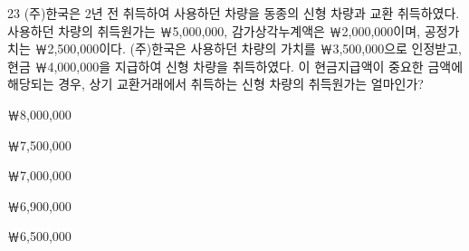 \begin{question}{23}
(주)한국은 2년 전 취득하여 사용하던 차량을 동종의 신형 차량과 교환 취득하였다. 사용하던 차량의 취득원가는 ￦5,000,000, 감가상각누계액은 ￦2,000,000이며, 공정가치는 ￦2,500,000이다. (주)한국은 사용하던 차량의 가치를 ￦3,500,000으로 인정받고, 현금 ￦4,000,000을 지급하여 신형 차량을 취득하였다. 이 현금지급액이 중요한 금액에 해당되는 경우, 상기 교환거래에서 취득하는 신형 차량의 취득원가는 얼마인가?
\begin{choices}
  \item ￦8,000,000
  \item ￦7,500,000
  \item ￦7,000,000
  \item ￦6,900,000
  \item ￦6,500,000
\end{choices}
\end{question}
